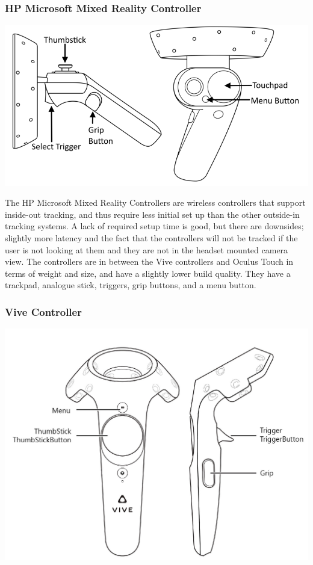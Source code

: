 \documentclass[onecolumn, draftclsnofoot,10pt, compsoc]{IEEEtran}
\begin{document}
\subsubsection{HP Microsoft Mixed Reality Controller}
\begin{center}
\includegraphics[scale=.35]{hpController.png}
\end{center}

The HP Microsoft Mixed Reality Controllers are wireless controllers that support inside-out tracking, and thus require less initial set up than the other outside-in tracking systems. A lack of required setup time is good, but there are downsides; slightly more latency and the fact that the controllers will not be tracked if the user is not looking at them and they are not in the headset mounted camera view. The controllers are in between the Vive controllers and Oculus Touch in terms of weight and size, and have a slightly lower build quality. They have a trackpad, analogue stick, triggers, grip buttons, and a menu button.

\subsubsection{Vive Controller}
\begin{center}
\includegraphics[scale=.20]{viveController.jpg}
\end{center}
\end{document}
